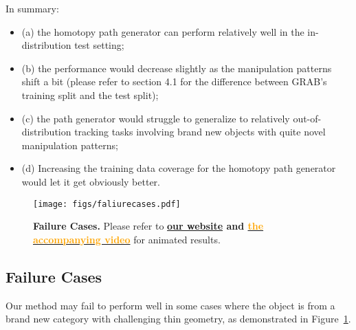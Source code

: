 \textcolor{myblue}{
In summary:
\begin{itemize}
    \item (a) the homotopy path generator can perform relatively well in the in-distribution test setting;
    \item (b) the performance would decrease slightly as the manipulation patterns shift a bit (please refer to section 4.1 for the difference between GRAB's training split and the test split); 
    \item (c) the path generator would struggle to generalize to relatively out-of-distribution tracking tasks involving brand new objects with quite novel manipulation patterns; 
    \item (d) Increasing the training data coverage for the homotopy path generator would let it get obviously better. 
\end{itemize}
}













\begin{figure}[h]
  \centering
  \texttt{[image: figs/faliurecases.pdf]}
  \caption{
  \textbf{Failure Cases. }
  Please refer to \textbf{\href{https://projectwebsite7.github.io/gene-dex-manip/}{our website} and {\href{https://projectwebsite7.github.io/gene-dex-manip/static/videos-lowres/video_7.mp4}{\textcolor{orange}{the accompanying video}}}} for animated results.
  }
  \label{fig_failure_cases}
\end{figure}

\subsection{Failure Cases} \label{sec:failurecase}

Our method may fail to perform well in some cases where the object is from a brand new category with challenging thin geometry, as demonstrated in Figure~\ref{fig_failure_cases}. 



